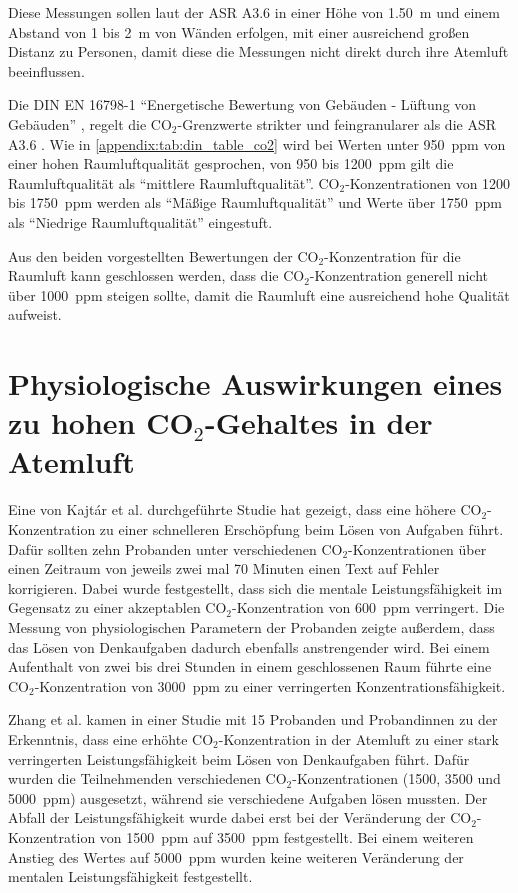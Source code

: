 \documentclass[a4paper,
    11pt,
    headings=small,
    ngerman,
    listof=totoc,
    numbers=noenddot]{scrreprt}[2021/11/13]
\begin{document}
Diese Messungen sollen laut der \ac{ASR} A3.6 \autocite{ASR} in einer Höhe von \SI{1.50}{\metre} und einem Abstand von \si{1} bis \SI{2}{\metre} von Wänden erfolgen, mit einer ausreichend großen Distanz zu Personen, damit diese die Messungen nicht direkt durch ihre Atemluft beeinflussen.

Die DIN EN 16798-1 \autocite{din_en_16798} \enquote{Energetische Bewertung von Gebäuden - Lüftung von Gebäuden} \autocite{din_en_16798}, regelt die CO$_2$-Grenzwerte strikter und feingranularer als die \ac{ASR} A3.6 \autocite{ASR}. Wie in \vref{appendix:tab:din_table_co2} wird bei Werten unter \SI{950}{\ac{ppm}} von einer hohen Raumluftqualität gesprochen, von \si{950} bis \SI{1200}{\ac{ppm}} gilt die Raumluftqualität als \enquote{mittlere Raumluftqualität}. CO$_2$-Konzentrationen von \si{1200} bis \SI{1750}{\ac{ppm}} werden als \enquote{Mäßige Raumluftqualität} und Werte über \SI{1750}{\ac{ppm}} als \enquote{Niedrige Raumluftqualität} eingestuft.

Aus den beiden vorgestellten Bewertungen der CO$_2$-Konzentration für die Raumluft kann geschlossen werden, dass die CO$_2$-Konzentration generell nicht über \SI{1000}{\ac{ppm}} steigen sollte, damit die Raumluft eine ausreichend hohe Qualität aufweist.


\section{Physiologische Auswirkungen eines zu hohen CO\texorpdfstring{$_2$}{TEXT}-Gehaltes in der Atemluft}

Eine von Kajtár et al. \autocite{kajtar} durchgeführte Studie hat gezeigt, dass eine höhere CO$_2$-Konzentration zu einer schnelleren Erschöpfung beim Lösen von Aufgaben führt. Dafür sollten zehn Probanden unter verschiedenen CO$_2$-Konzentrationen über einen Zeitraum von jeweils zwei mal 70 Minuten einen Text auf Fehler korrigieren. Dabei wurde festgestellt, dass sich die mentale Leistungsfähigkeit im Gegensatz zu einer akzeptablen CO$_2$-Konzentration von \SI{600}{\ac{ppm}} verringert. Die Messung von physiologischen Parametern der Probanden zeigte außerdem, dass das Lösen von Denkaufgaben dadurch ebenfalls anstrengender wird. Bei einem Aufenthalt von zwei bis drei Stunden in einem geschlossenen Raum führte eine CO$_2$-Konzentration von \SI{3000}{\ac{ppm}} zu einer verringerten Konzentrationsfähigkeit.

Zhang et al. \autocite{zhang} kamen in einer Studie mit 15 Probanden und Probandinnen zu der Erkenntnis, dass eine erhöhte CO$_2$-Konzentration in der Atemluft zu einer stark verringerten Leistungsfähigkeit beim Lösen von Denkaufgaben führt. Dafür wurden die  Teilnehmenden verschiedenen CO$_2$-Konzentrationen (\si{1500}, \si{3500} und \SI{5000}{\ac{ppm}}) ausgesetzt, während sie verschiedene Aufgaben lösen mussten. Der Abfall der Leistungsfähigkeit wurde dabei erst bei der Veränderung der CO$_2$-Konzentration von \SI{1500}{\ac{ppm}} auf \SI{3500}{\ac{ppm}} festgestellt. Bei einem weiteren Anstieg des Wertes auf \SI{5000}{\ac{ppm}} wurden keine weiteren Veränderung der mentalen Leistungsfähigkeit festgestellt.
\end{document}

